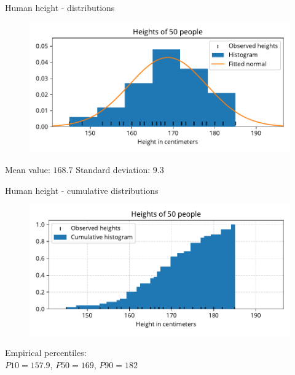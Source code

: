 \documentclass[12pt, aspectratio=149]{beamer}
\theoremstyle{plain}
\begin{document}
\begin{frame}[fragile]{Human height - distributions}
    \begin{center}
     \begin{figure}
     	\centering
     	\includegraphics[width=0.99\linewidth]{figures/heights_3}
     \end{figure}
     Mean value: $168.7$ \hspace*{4em} Standard deviation: $9.3$
     \end{center}
\end{frame}

\begin{frame}[fragile]{Human height - cumulative distributions}
    \begin{center}
     \begin{figure}
     	\centering
     	\includegraphics[width=0.99\linewidth]{figures/heights_cumulative_2}
     \end{figure}
     Empirical percentiles:\\$P10 = 157.9$,\hspace*{1em} $P50 = 169$,\hspace*{1em} $P90 = 182$
     \end{center}
\end{frame}
\end{document}

